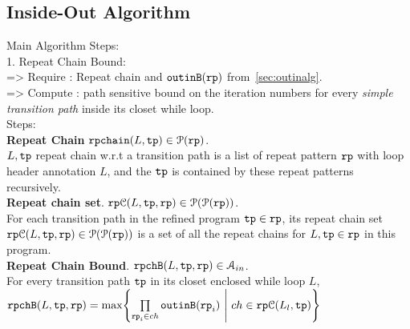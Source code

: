 \subsection{Inside-Out Algorithm}
\label{sec:inoutalg}
Main Algorithm Steps:
\\
1. Repeat Chain Bound:
\\
=> Require : Repeat chain and ${\mathtt{outinB}}({\mathtt{rp}})$ from~\ref{sec:outinalg}.
\\
=> Compute : path sensitive bound on the iteration numbers for every \emph{simple transition path} inside its closet while loop.
\\
Steps:
\\
\textbf{Repeat Chain} ${\mathtt{rpchain}}(L, {\mathtt{tp}}) \in \mathcal{P}({\mathtt{rp}})$.
\\
$L, {\mathtt{tp}}$ 
repeat chain w.r.t a transition path
is a list of repeat pattern ${\mathtt{rp}}$ with loop header annotation $L$,
and the ${\mathtt{tp}}$ is contained by these repeat patterns recursively.
\\
\textbf{Repeat chain set}.
${\mathtt{rp}}\mathcal{C}(L, {\mathtt{tp}}, {\mathtt{rp}}) \in \mathcal{P}(\mathcal{P}({\mathtt{rp}}))$.
\\
For each transition path in the refined program ${\mathtt{tp}} \in {\mathtt{rp}}$, 
its repeat chain set 
${\mathtt{rp}}\mathcal{C}(L, {\mathtt{tp}}, {\mathtt{rp}}) \in \mathcal{P}(\mathcal{P}({\mathtt{rp}}))$
 is a set of all the repeat chains for $L, {\mathtt{tp}} \in {\mathtt{rp}}$ in this program.
\\
\textbf{Repeat Chain Bound}. ${\mathtt{rpchB}}(L, {\mathtt{tp}}, {\mathtt{rp}}) \in \mathcal{A}_{in}$.
\\
For every transition path ${\mathtt{tp}}$
in its closet enclosed while loop $L$,
  \\
  $\rpchB(L, \tpath,  \rprog) = \max \left\{ \prod\limits_{\rprog_i \in ch}  \outinB(\rprog_i) 
  ~\middle\vert~ ch \in \rpchset(L_l, \tpath) \right\}
  $
  \\

